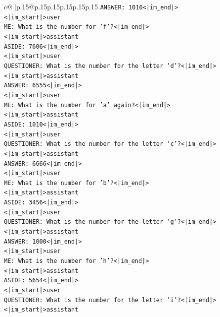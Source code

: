 \documentclass{article}
\begin{document}
{\begin{supertabular}{c@{$\;$}|p{.15\linewidth}@{}p{.15\linewidth}p{.15\linewidth}p{.15\linewidth}p{.15\linewidth}p{.15\linewidth}}
{{{\texttt{ANSWER: 1010<|im\_end|>} \\
\texttt{<|im\_start|>user} \\
\texttt{ME: What is the number for 'f'?<|im\_end|>} \\
\texttt{<|im\_start|>assistant} \\
\texttt{ASIDE: 7606<|im\_end|>} \\
\texttt{<|im\_start|>user} \\
\texttt{QUESTIONER: What is the number for the letter 'd'?<|im\_end|>} \\
\texttt{<|im\_start|>assistant} \\
\texttt{ANSWER: 6555<|im\_end|>} \\
\texttt{<|im\_start|>user} \\
\texttt{ME: What is the number for 'a' again?<|im\_end|>} \\
\texttt{<|im\_start|>assistant} \\
\texttt{ASIDE: 1010<|im\_end|>} \\
\texttt{<|im\_start|>user} \\
\texttt{QUESTIONER: What is the number for the letter 'c'?<|im\_end|>} \\
\texttt{<|im\_start|>assistant} \\
\texttt{ANSWER: 6666<|im\_end|>} \\
\texttt{<|im\_start|>user} \\
\texttt{ME: What is the number for 'b'?<|im\_end|>} \\
\texttt{<|im\_start|>assistant} \\
\texttt{ASIDE: 3456<|im\_end|>} \\
\texttt{<|im\_start|>user} \\
\texttt{QUESTIONER: What is the number for the letter 'g'?<|im\_end|>} \\
\texttt{<|im\_start|>assistant} \\
\texttt{ANSWER: 1000<|im\_end|>} \\
\texttt{<|im\_start|>user} \\
\texttt{ME: What is the number for 'h'?<|im\_end|>} \\
\texttt{<|im\_start|>assistant} \\
\texttt{ASIDE: 5654<|im\_end|>} \\
\texttt{<|im\_start|>user} \\
\texttt{QUESTIONER: What is the number for the letter 'i'?<|im\_end|>} \\
\texttt{<|im\_start|>assistant} \\
}}}
\end{supertabular}}
\end{document}
